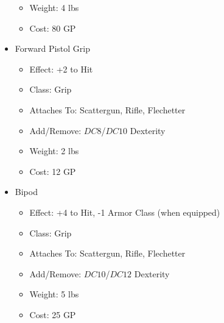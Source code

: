 \documentclass[12pt, twoside]{article}
\begin{document}
\begin{FlushLeft}
\begin{multicols}{2}
\begin{itemize}[wide]
\begin{itemize}
					\item Weight: 4 lbs
					\item Cost: 80 GP
				\end{itemize}
				\vfill \pagebreak
				\item Forward Pistol Grip
				\begin{itemize}
					\item Effect: +2 to Hit
					\item Class: Grip
					\item Attaches To: Scattergun, Rifle, Flechetter 
					\item Add/Remove: $DC8$/$DC10$ Dexterity
					\item Weight: 2 lbs
					\item Cost: 12 GP
				\end{itemize}
				\item Bipod
				\begin{itemize}
					\item Effect: +4 to Hit, -1 Armor Class (when equipped)
					\item Class: Grip
					\item Attaches To: Scattergun, Rifle, Flechetter 
					\item Add/Remove: $DC10$/$DC12$ Dexterity
					\item Weight: 5 lbs
					\item Cost: 25 GP
				\end{itemize}
			\end{itemize}
			\vfill \null \columnbreak


\end{multicols}
\end{FlushLeft}
\end{document}
